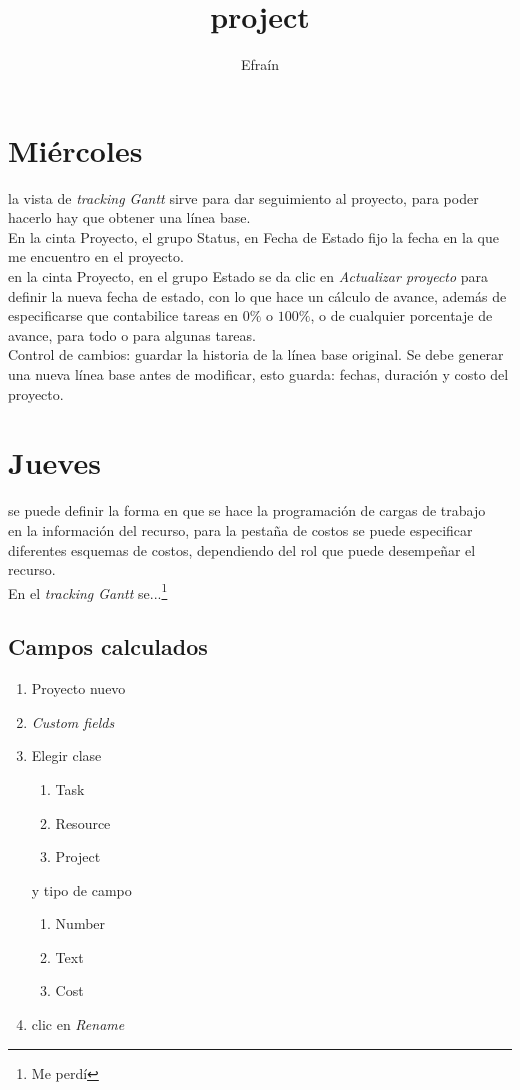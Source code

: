 \documentclass[11pt]{article} %
\title{project}
\author{Efraín}
\begin{document}
\maketitle
\tableofcontents
\section{Miércoles}

la vista de \emph{tracking Gantt} sirve para dar seguimiento al proyecto, para poder hacerlo hay que obtener una línea base.\\

En la cinta Proyecto, el grupo Status, en Fecha de Estado fijo la fecha en la que me encuentro en el proyecto.\\

en la cinta Proyecto, en el grupo Estado se da clic en \emph{Actualizar proyecto} para definir la nueva fecha de estado, con lo que hace un cálculo de avance, además de especificarse que contabilice tareas en $0\%$ o $100\%$, o de cualquier porcentaje de avance, para todo o para algunas tareas.\\

Control de cambios: guardar la historia de la línea base original. Se debe generar una nueva línea base antes de modificar, esto guarda: fechas, duración y costo del proyecto.\\

\section{Jueves}
se puede definir la forma en que se hace la programación de cargas de trabajo\\

en la información del recurso, para la pestaña de costos se puede especificar diferentes esquemas de costos, dependiendo del rol que puede desempeñar el recurso.\\

En el \emph{tracking Gantt} se...\footnote{Me perdí}

\subsection{Campos calculados}
\begin{enumerate}
\item Proyecto nuevo
\item \emph{Custom fields}
\item Elegir clase
\begin{enumerate}
\item Task
\item Resource
\item Project
\end{enumerate}
 y tipo de campo
\begin{enumerate}
\item Number
\item Text
\item Cost
\end{enumerate}
\item clic en \emph{Rename}
\end{enumerate}
\end{document}
